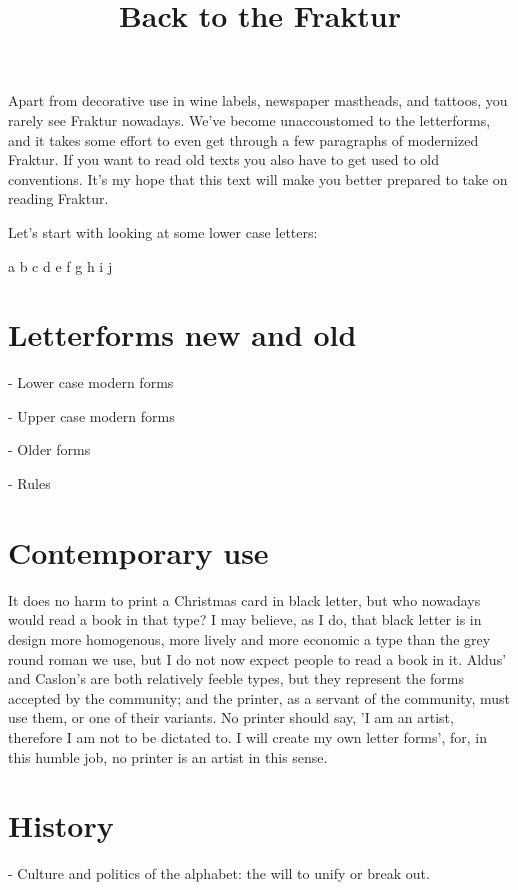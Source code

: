 \title{Back to the Fraktur}

Apart from decorative use in wine labels, newspaper mastheads, and tattoos, you rarely see Fraktur nowadays. We've become unaccoustomed to the letterforms, and it takes some effort to even get through a few paragraphs of modernized Fraktur. If you want to read old texts you also have to get used to old conventions. It's my hope that this text will make you better prepared to take on reading Fraktur.

Let's start with looking at some lower case letters:

\beginblockquote
{\UnifrakturMaguntiaXVI a b c d e f g h i j}
\endblockquote



\section{Letterforms new and old}
- Lower case modern forms

- Upper case modern forms

- Older forms

- Rules %

\section{Contemporary use}

{ 
It does no harm to print a Christmas card in black letter, but who nowadays would read a book in that type? I may believe, as I do, that black letter is in design more homogenous, more lively and more economic a type than the grey round roman we use, but I do not now expect people to read a book in it. Aldus\null' and Caslon's are both relatively feeble types, but they represent the forms accepted by the community; and the printer, as a servant of the community, must use them, or one of their variants. No printer should say, 'I am an artist, therefore I am not to be dictated to. I will create my own letter forms', for, in this humble job, no printer is an artist in this sense.

}

\section{History}
- Culture and politics of the alphabet: the will to unify or break out. 


